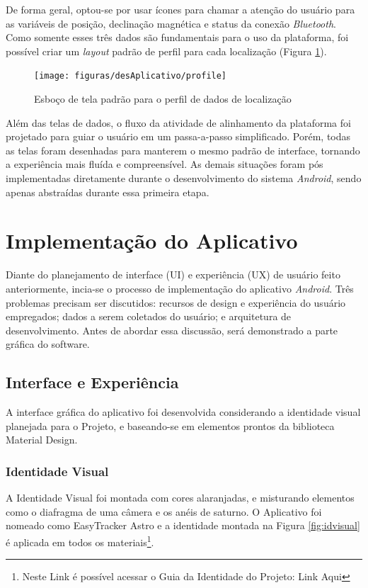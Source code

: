 De forma geral, optou-se por usar ícones para chamar a atenção do usuário para as variáveis de posição, declinação magnética e status da conexão \textit{Bluetooth}. Como somente esses três dados são fundamentais para o uso da plataforma, foi possível criar um \textit{layout} padrão de perfil para cada localização (Figura \ref{fig:layoutpadraoperfil}). 

\begin{figure}[!htb]
	\centering
	\caption{Esboço de tela padrão para o perfil de dados de localização}
	\texttt{[image: figuras/desAplicativo/profile]}
	\label{fig:layoutpadraoperfil}
\end{figure}

Além das telas de dados, o fluxo da atividade de alinhamento da plataforma foi projetado para guiar o usuário em um passa-a-passo simplificado. Porém, todas as telas foram desenhadas para manterem o mesmo padrão de interface, tornando a experiência mais fluída e compreensível. As demais situações foram pós implementadas diretamente durante o desenvolvimento do sistema \textit{Android}, sendo apenas abstraídas durante essa primeira etapa.

\section{Implementação do Aplicativo}

Diante do planejamento de interface (UI) e experiência (UX) de usuário feito anteriormente, incia-se o processo de implementação do aplicativo \textit{Android}. Três problemas precisam ser discutidos: recursos de design e experiência do usuário empregados; dados a serem coletados do usuário; e arquitetura de desenvolvimento. Antes de abordar essa discussão, será demonstrado a parte gráfica do software.

\subsection{Interface e Experiência}

A interface gráfica do aplicativo foi desenvolvida considerando a identidade visual planejada para o Projeto, e baseando-se em elementos prontos da biblioteca Material Design.

\subsubsection{Identidade Visual}
A Identidade Visual foi montada com cores alaranjadas, e misturando elementos como o diafragma de uma câmera e os anéis de saturno. O Aplicativo foi nomeado como EasyTracker Astro e a identidade montada na Figura \ref{fig:idvisual} é aplicada em todos os materiais\footnote{Neste Link é possível acessar o Guia da Identidade do Projeto: Link Aqui}.

